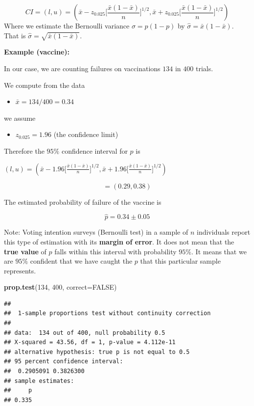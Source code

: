 \documentclass[
]{book}
\newenvironment{Shaded}{\begin{snugshade}}{\end{snugshade}}
\newcommand{\AttributeTok}[1]{\textcolor[rgb]{0.13,0.29,0.53}{#1}}
\newcommand{\ConstantTok}[1]{\textcolor[rgb]{0.56,0.35,0.01}{#1}}
\newcommand{\DecValTok}[1]{\textcolor[rgb]{0.00,0.00,0.81}{#1}}
\newcommand{\FunctionTok}[1]{\textcolor[rgb]{0.13,0.29,0.53}{\textbf{#1}}}
\newcommand{\NormalTok}[1]{#1}
\providecommand{\tightlist}{%
  \setlength{\itemsep}{0pt}\setlength{\parskip}{0pt}}
\begin{document}
\[CI=(l,u)=(\bar{x}-z_{0.025}\big[\frac{\bar{x}(1-\bar{x})}{n} \big]^{1/2},  \bar{x}+z_{0.025}\big[\frac{\bar{x}(1-\bar{x})}{n} \big]^{1/2})\]
Where we estimate the Bernoulli variance \(\sigma=p(1-p)\) by \(\hat{\sigma}=\bar{x}(1-\bar{x})\). That is \(\hat{\sigma}=\sqrt{\bar{x}(1-\bar{x})}\).

\textbf{Example (vaccine):}

In our case, we are counting failures on vaccinations \(134\) in \(400\) trials.

We compute from the data

\begin{itemize}
\tightlist
\item
  \(\bar{x}=134/400=0.34\)
\end{itemize}

we assume

\begin{itemize}
\tightlist
\item
  \(z_{0.025}=1.96\) (the confidence limit)
\end{itemize}

Therefore the \(95\%\) confidence interval for \(p\) is

\((l,u)=(\bar{x}-1.96 \big[\frac{\bar{x}(1-\bar{x})}{n} \big]^{1/2}, \bar{x}+1.96 \big[\frac{\bar{x}(1-\bar{x})}{n} \big]^{1/2})\)

\[=(0.29,0.38)\]

The estimated probability of failure of the vaccine is

\[\hat{p}=0.34 \pm 0.05\]

Note: Voting intention surveys (Bernoulli test) in a sample of \(n\) individuals report this type of estimation with its \textbf{margin of error}. It does not mean that the \textbf{true value} of \(p\) falls within this interval with probability \(95\%\). It means that we are \(95\%\) confident that we have caught the \(p\) that this particular sample represents.

\begin{Shaded}
\begin{Highlighting}[]
\FunctionTok{prop.test}\NormalTok{(}\DecValTok{134}\NormalTok{, }\DecValTok{400}\NormalTok{, }\AttributeTok{correct=}\ConstantTok{FALSE}\NormalTok{)}
\end{Highlighting}
\end{Shaded}

\begin{verbatim}
## 
##  1-sample proportions test without continuity correction
## 
## data:  134 out of 400, null probability 0.5
## X-squared = 43.56, df = 1, p-value = 4.112e-11
## alternative hypothesis: true p is not equal to 0.5
## 95 percent confidence interval:
##  0.2905091 0.3826300
## sample estimates:
##     p 
## 0.335
\end{verbatim}
\end{document}
